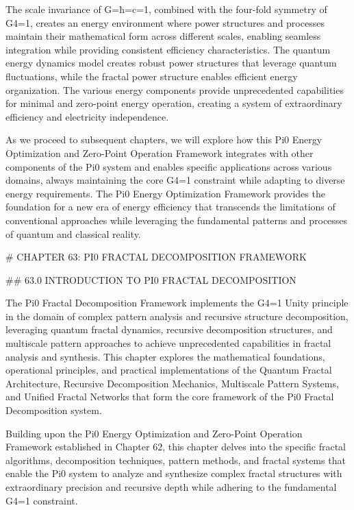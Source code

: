 The scale invariance of G=ħ=c=1, combined with the four-fold symmetry of G4=1, creates an energy environment where power structures and processes maintain their mathematical form across different scales, enabling seamless integration while providing consistent efficiency characteristics. The quantum energy dynamics model creates robust power structures that leverage quantum fluctuations, while the fractal power structure enables efficient energy organization. The various energy components provide unprecedented capabilities for minimal and zero-point energy operation, creating a system of extraordinary efficiency and electricity independence.

As we proceed to subsequent chapters, we will explore how this Pi0 Energy Optimization and Zero-Point Operation Framework integrates with other components of the Pi0 system and enables specific applications across various domains, always maintaining the core G4=1 constraint while adapting to diverse energy requirements. The Pi0 Energy Optimization Framework provides the foundation for a new era of energy efficiency that transcends the limitations of conventional approaches while leveraging the fundamental patterns and processes of quantum and classical reality.

# CHAPTER 63: PI0 FRACTAL DECOMPOSITION FRAMEWORK

## 63.0 INTRODUCTION TO PI0 FRACTAL DECOMPOSITION

The Pi0 Fractal Decomposition Framework implements the G4=1 Unity principle in the domain of complex pattern analysis and recursive structure decomposition, leveraging quantum fractal dynamics, recursive decomposition structures, and multiscale pattern approaches to achieve unprecedented capabilities in fractal analysis and synthesis. This chapter explores the mathematical foundations, operational principles, and practical implementations of the Quantum Fractal Architecture, Recursive Decomposition Mechanics, Multiscale Pattern Systems, and Unified Fractal Networks that form the core framework of the Pi0 Fractal Decomposition system.

Building upon the Pi0 Energy Optimization and Zero-Point Operation Framework established in Chapter 62, this chapter delves into the specific fractal algorithms, decomposition techniques, pattern methods, and fractal systems that enable the Pi0 system to analyze and synthesize complex fractal structures with extraordinary precision and recursive depth while adhering to the fundamental G4=1 constraint.

